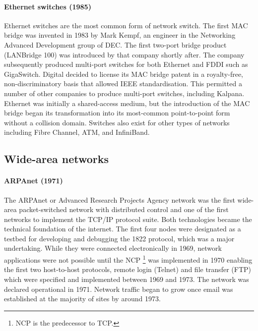 \paragraph{Ethernet switches (1985)}%
Ethernet switches are the most common form of network switch.
The first \acs{MAC} bridge was invented in 1983 by Mark Kempf, an engineer in the Networking Advanced Development group of \gls{DEC}.
The first two-port bridge product (LANBridge 100) was introduced by that company shortly after.
The company subsequently produced multi-port switches for both Ethernet and \acs{FDDI} such as GigaSwitch.
Digital decided to license its \acs{MAC} bridge patent in a royalty-free, non-dis\-crim\-i\-na\-tory basis that allowed \acs{IEEE} standardisation.
This permitted a number of other companies to produce multi-port switches, including Kalpana.
Ethernet was initially a shared-access medium, but the introduction of the \acs{MAC} bridge began its transformation into its most-common point-to-point form without a collision domain.
Switches also exist for other types of networks including Fibre Channel, \gls{ATM}, and InfiniBand.
    
\subsection{Wide-area networks}
\label{sec:network-evoluation-wan}

\paragraph{ARPAnet (1971)}%
The ARPAnet or Advanced Research Projects Agency network was the first wide-area packet-switched network with distributed control and one of the first networks to implement the \acs{TCP}/\acs{IP} protocol suite.
Both technologies became the technical foundation of the internet.
The first four nodes were designated as a testbed for developing and debugging the 1822 protocol, which was a major undertaking.
While they were connected electronically in 1969, network applications were not possible until the \gls{NCP}%
   \footnote{\acs{NCP} is the predecessor to \acs{TCP}.}
was implemented in 1970 enabling the first two host-to-host protocols, remote login (Telnet) and file transfer (\acs{FTP}) which were specified and implemented between 1969 and 1973.
The network was declared operational in 1971.
Network traffic began to grow once email was established at the majority of sites by around 1973.

